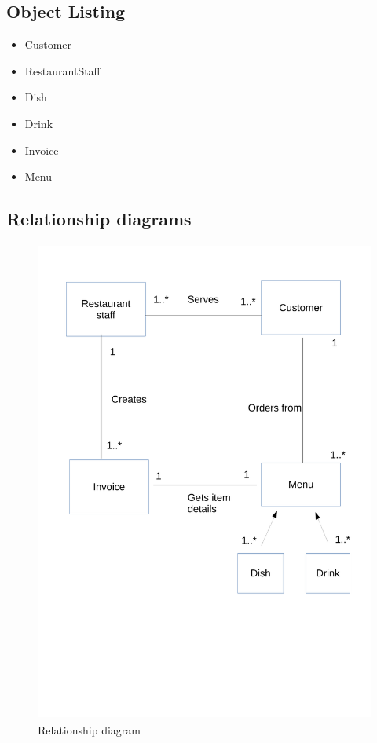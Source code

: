 \subsection{Object Listing}

\begin {itemize}
	\item Customer
	\item RestaurantStaff
	\item Dish
	\item Drink
	\item Invoice
	\item Menu
\end {itemize}

\subsection{Relationship diagrams}

\begin{figure}[H]
    \includegraphics[height = 16cm]{./Analysis/Objects}
    \caption{Relationship diagram} \label{fig:Objects}
\end{figure}


